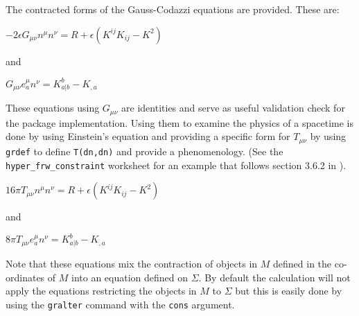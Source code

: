 \documentclass{article}
\begin{document}
The contracted forms of the Gauss-Codazzi equations are provided. These are:
\begin{center}
$-2 \epsilon G_{\mu \nu} n^\mu n^\nu = R + \epsilon \left( K^{i j}K_{ij} -K^2 \right)$ \\
\end{center}
and 
\begin{center}
$G_{\mu \nu} e^\mu_a n^\nu = K^b_{a|b} - K_{,a}$
\end{center}
These equations using $G_{\mu \nu}$ are identities and serve as useful validation check for the package implementation. Using them to 
examine the physics of a spacetime is done by using Einstein's equation and providing a specific form for $T_{\mu \nu}$
by using \texttt{grdef} to define \texttt{T(dn,dn)} and provide a phenomenology. (See the \texttt{hyper\_frw\_constraint} worksheet
for an example that follows section 3.6.2 in \cite{poisson:2004}). 

\begin{center}
$16 \pi T_{\mu \nu} n^\mu n^\nu = R + \epsilon \left( K^{i j}K_{ij} -K^2 \right)$ \\
\end{center}
and 
\begin{center}
$8 \pi T_{\mu \nu} e^\mu_a n^\nu = K^b_{a|b} - K_{,a}$
\end{center}

Note that these equations mix the contraction of objects in $M$ defined in the co-ordinates of $M$ into an equation 
defined on $\Sigma$. By default the 
calculation will not apply the equations restricting the objects in $M$ to $\Sigma$ but this is easily done by using the
\texttt{gralter} command with the \texttt{cons} argument. \\
\end{document}
